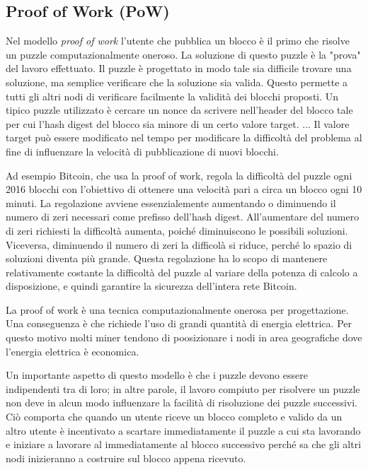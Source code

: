 \subsection{Proof of Work (PoW)}
Nel modello \textit{proof of work} l'utente che pubblica un blocco è il primo che risolve
un puzzle computazionalmente oneroso. La soluzione di questo puzzle è la "prova" del lavoro effettuato.
Il puzzle è progettato in modo tale sia difficile trovare una soluzione, ma semplice verificare che la soluzione
sia valida. Questo permette a tutti gli altri nodi di verificare facilmente la validità dei blocchi proposti.
Un tipico puzzle utilizzato è cercare un nonce da scrivere nell'header del blocco
tale per cui l'hash digest del blocco sia minore di un certo valore target. ...
Il valore target può essere modificato nel tempo per modificare la difficoltà del problema al fine di
influenzare la velocità di pubblicazione di nuovi blocchi.

Ad esempio Bitcoin, che usa la proof of work, regola la difficoltà del puzzle ogni 2016 blocchi
con l'obiettivo di ottenere una velocità pari a circa un blocco ogni 10 minuti. La regolazione
avviene essenzialemente aumentando o diminuendo il numero di zeri necessari come prefisso dell'hash digest.
All'aumentare del numero di zeri richiesti la difficoltà aumenta, poiché diminuiscono le possibili soluzioni.
Viceversa, diminuendo il numero di zeri la difficolà si riduce, perché lo spazio di soluzioni diventa più grande.
Questa regolazione ha lo scopo di mantenere relativamente costante la difficoltà del puzzle al variare della
potenza di calcolo a disposizione, e quindi garantire la sicurezza dell'intera rete Bitcoin.

La proof of work è una tecnica computazionalmente onerosa per progettazione. Una conseguenza è che richiede
l'uso di grandi quantità di energia elettrica. Per questo motivo molti miner tendono di poosizionare
i nodi in area geografiche dove l'energia elettrica è economica.

Un importante aspetto di questo modello è che i puzzle devono essere indipendenti tra di loro; in
altre parole, il lavoro compiuto per risolvere un puzzle non deve in alcun modo influenzare la facilità di
risoluzione dei puzzle successivi. Ciò comporta che quando un utente riceve un blocco completo
e valido da un altro utente è incentivato a scartare immediatamente il puzzle a cui sta lavorando e
iniziare a lavorare al immediatamente al blocco successivo perché sa che gli altri nodi
inizieranno a costruire sul blocco appena ricevuto.


